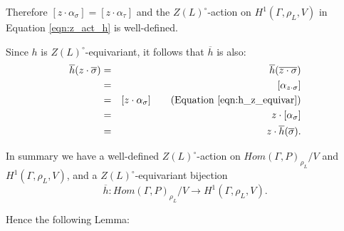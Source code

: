 Therefore $[z \cdot \alpha_\sigma] = [z \cdot \alpha_\tau]$ and the $Z(L)^\circ$-action on $H^1(\Gamma, \rho_L, V)$ in Equation \ref{eqn:z_act_h} is well-defined.

Since $h$ is $Z(L)^\circ$-equivariant, it follows that $\overline{h}$ is also:
\begin{eqnarray*}
  \overline{h}(z \cdot \overline{\sigma}) &=& \overline{h}(\overline{z \cdot \sigma}) \\
  &=& [\alpha_{z \cdot \sigma}] \\
  &=& [z \cdot \alpha_\sigma] \qquad (\textrm{Equation }\ref{eqn:h_z_equivar}) \\
  &=& z \cdot [\alpha_\sigma] \\
  &=& z \cdot \overline{h}(\overline{\sigma}).
\end{eqnarray*}

In summary we have a well-defined $Z(L)^\circ$-action on $Hom(\Gamma, P)_{\rho_L}/V$ and $H^1(\Gamma, \rho_L, V)$, and a $Z(L)^\circ$-equivariant bijection 
\begin{displaymath}
  \overline{h}:Hom(\Gamma, P)_{\rho_L}/V \rightarrow H^1(\Gamma, \rho_L, V).
\end{displaymath}

Hence the following Lemma:

